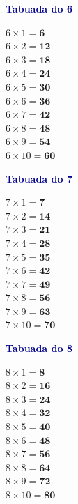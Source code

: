 \documentclass[12pt]{article}
\begin{document}
\vspace{10pt}\noindent
\begin{minipage}[t]{3.3cm}
\noindent\textcolor{darkblue}{\bfseries\small Tabuada do 6}\par\vspace{2pt}
{\footnotesize
$6\times1=\mathbf{6}$\\$6\times2=\mathbf{12}$\\$6\times3=\mathbf{18}$\\
$6\times4=\mathbf{24}$\\$6\times5=\mathbf{30}$\\$6\times6=\mathbf{36}$\\
$6\times7=\mathbf{42}$\\$6\times8=\mathbf{48}$\\$6\times9=\mathbf{54}$\\
$6\times10=\mathbf{60}$}
\end{minipage}\hfill
\begin{minipage}[t]{3.3cm}
\noindent\textcolor{darkblue}{\bfseries\small Tabuada do 7}\par\vspace{2pt}
{\footnotesize
$7\times1=\mathbf{7}$\\$7\times2=\mathbf{14}$\\$7\times3=\mathbf{21}$\\
$7\times4=\mathbf{28}$\\$7\times5=\mathbf{35}$\\$7\times6=\mathbf{42}$\\
$7\times7=\mathbf{49}$\\$7\times8=\mathbf{56}$\\$7\times9=\mathbf{63}$\\
$7\times10=\mathbf{70}$}
\end{minipage}\hfill
\begin{minipage}[t]{3.3cm}
\noindent\textcolor{darkblue}{\bfseries\small Tabuada do 8}\par\vspace{2pt}
{\footnotesize
$8\times1=\mathbf{8}$\\$8\times2=\mathbf{16}$\\$8\times3=\mathbf{24}$\\
$8\times4=\mathbf{32}$\\$8\times5=\mathbf{40}$\\$8\times6=\mathbf{48}$\\
$8\times7=\mathbf{56}$\\$8\times8=\mathbf{64}$\\$8\times9=\mathbf{72}$\\
$8\times10=\mathbf{80}$}
\end{minipage}\hfill
\end{document}

